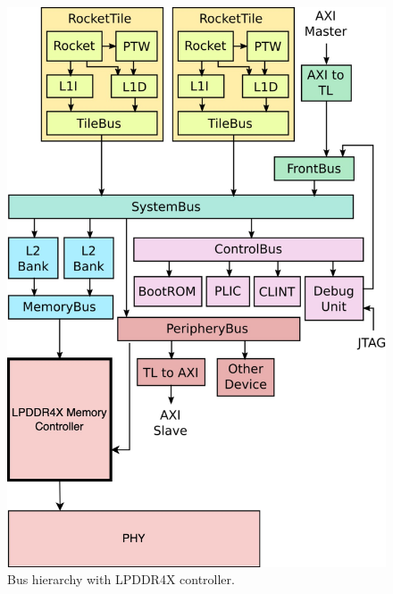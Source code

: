 \begin{figure}
    \centering
    \includegraphics[scale=0.2]{images/bus.jpg}
    \caption{Bus hierarchy with LPDDR4X controller.}
    \label{fig:bus}
\end{figure}

